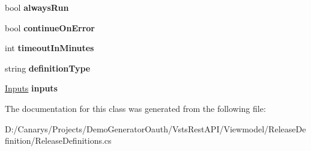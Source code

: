 \begin{DoxyCompactItemize}
\item 
\mbox{\label{class_vsts_rest_a_p_i_1_1_viewmodel_1_1_release_definition_1_1_release_definitions_1_1_task_a42b2fdd7b5ac3ce9632e408aeb445e2b}} 
bool {\bfseries always\+Run}
\item 
\mbox{\label{class_vsts_rest_a_p_i_1_1_viewmodel_1_1_release_definition_1_1_release_definitions_1_1_task_a660539378c18abbf2335c3e66033d065}} 
bool {\bfseries continue\+On\+Error}
\item 
\mbox{\label{class_vsts_rest_a_p_i_1_1_viewmodel_1_1_release_definition_1_1_release_definitions_1_1_task_a8724ad6a7be01b0a647d09c74f1802a6}} 
int {\bfseries timeout\+In\+Minutes}
\item 
\mbox{\label{class_vsts_rest_a_p_i_1_1_viewmodel_1_1_release_definition_1_1_release_definitions_1_1_task_a9943e1af8b117949183f88b744395b7b}} 
string {\bfseries definition\+Type}
\item 
\mbox{\label{class_vsts_rest_a_p_i_1_1_viewmodel_1_1_release_definition_1_1_release_definitions_1_1_task_a579b0b151c6bb96e6134ed3a42b5cfe2}} 
\mbox{\hyperlink{class_vsts_rest_a_p_i_1_1_viewmodel_1_1_release_definition_1_1_release_definitions_1_1_inputs}{Inputs}} {\bfseries inputs}
\end{DoxyCompactItemize}


The documentation for this class was generated from the following file\+:\begin{DoxyCompactItemize}
\item 
D\+:/\+Canarys/\+Projects/\+Demo\+Generator\+Oauth/\+Vsts\+Rest\+A\+P\+I/\+Viewmodel/\+Release\+Definition/Release\+Definitions.\+cs\end{DoxyCompactItemize}
